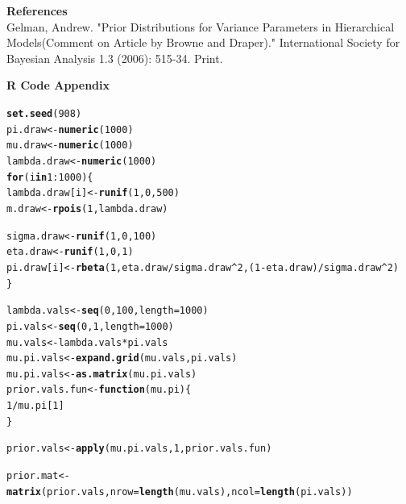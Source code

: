 \documentclass[12pt]{article}\usepackage[]{graphicx}\usepackage[]{color}
\makeatletter
\newcommand{\hlnum}[1]{\textcolor[rgb]{0.686,0.059,0.569}{#1}}%
\newcommand{\hlopt}[1]{\textcolor[rgb]{0,0,0}{#1}}%
\newcommand{\hlstd}[1]{\textcolor[rgb]{0.345,0.345,0.345}{#1}}%
\newcommand{\hlkwa}[1]{\textcolor[rgb]{0.161,0.373,0.58}{\textbf{#1}}}%
\newcommand{\hlkwb}[1]{\textcolor[rgb]{0.69,0.353,0.396}{#1}}%
\newcommand{\hlkwc}[1]{\textcolor[rgb]{0.333,0.667,0.333}{#1}}%
\newcommand{\hlkwd}[1]{\textcolor[rgb]{0.737,0.353,0.396}{\textbf{#1}}}%
\newenvironment{kframe}{%
 \def\at@end@of@kframe{}%
 \ifinner\ifhmode%
  \def\at@end@of@kframe{\end{minipage}}%
  \begin{minipage}{\columnwidth}%
 \fi\fi%
 \def\FrameCommand##1{\hskip\@totalleftmargin \hskip-\fboxsep
 \colorbox{shadecolor}{##1}\hskip-\fboxsep
     \hskip-\linewidth \hskip-\@totalleftmargin \hskip\columnwidth}%
 \MakeFramed {\advance\hsize-\width
   \@totalleftmargin\z@ \linewidth\hsize
   \@setminipage}}%
 {\par\unskip\endMakeFramed%
 \at@end@of@kframe}
\newenvironment{knitrout}{}{} %
\makeatother
\begin{document}
{\Large \bf References} \\

\noindent Gelman, Andrew. "Prior Distributions for Variance Parameters in Hierarchical Models(Comment on Article by Browne and Draper)." International Society for Bayesian Analysis 1.3 (2006): 515-34. Print.

{\Large \bf R Code Appendix}

\begin{knitrout}\footnotesize
{}\color{fgcolor}\begin{kframe}
\begin{alltt}
\hlkwd{set.seed}\hlstd{(}\hlnum{908}\hlstd{)}
\hlstd{pi.draw} \hlkwb{<-} \hlkwd{numeric}\hlstd{(}\hlnum{1000}\hlstd{)}
\hlstd{mu.draw} \hlkwb{<-} \hlkwd{numeric}\hlstd{(}\hlnum{1000}\hlstd{)}
\hlstd{lambda.draw} \hlkwb{<-} \hlkwd{numeric}\hlstd{(}\hlnum{1000}\hlstd{)}
\hlkwa{for}\hlstd{(i} \hlkwa{in} \hlnum{1}\hlopt{:}\hlnum{1000}\hlstd{)\{}
  \hlstd{lambda.draw[i]} \hlkwb{<-} \hlkwd{runif}\hlstd{(}\hlnum{1}\hlstd{,} \hlnum{0}\hlstd{,} \hlnum{500}\hlstd{)}
  \hlstd{m.draw} \hlkwb{<-} \hlkwd{rpois}\hlstd{(}\hlnum{1}\hlstd{, lambda.draw)}

  \hlstd{sigma.draw} \hlkwb{<-} \hlkwd{runif}\hlstd{(}\hlnum{1}\hlstd{,} \hlnum{0}\hlstd{,} \hlnum{100}\hlstd{)}
  \hlstd{eta.draw} \hlkwb{<-} \hlkwd{runif}\hlstd{(}\hlnum{1}\hlstd{,} \hlnum{0}\hlstd{,} \hlnum{1}\hlstd{)}
  \hlstd{pi.draw[i]} \hlkwb{<-} \hlkwd{rbeta}\hlstd{(}\hlnum{1}\hlstd{, eta.draw}\hlopt{/}\hlstd{sigma.draw}\hlopt{^}\hlnum{2}\hlstd{, (}\hlnum{1}\hlopt{-}\hlstd{eta.draw)}\hlopt{/}\hlstd{sigma.draw}\hlopt{^}\hlnum{2}\hlstd{)}
\hlstd{\}}

\hlstd{lambda.vals} \hlkwb{<-} \hlkwd{seq}\hlstd{(}\hlnum{0}\hlstd{,} \hlnum{100}\hlstd{,} \hlkwc{length}\hlstd{=}\hlnum{1000}\hlstd{)}
\hlstd{pi.vals} \hlkwb{<-} \hlkwd{seq}\hlstd{(}\hlnum{0}\hlstd{,} \hlnum{1}\hlstd{,} \hlkwc{length}\hlstd{=}\hlnum{1000}\hlstd{)}
\hlstd{mu.vals} \hlkwb{<-} \hlstd{lambda.vals}\hlopt{*}\hlstd{pi.vals}
\hlstd{mu.pi.vals} \hlkwb{<-} \hlkwd{expand.grid}\hlstd{(mu.vals, pi.vals)}
\hlstd{mu.pi.vals} \hlkwb{<-} \hlkwd{as.matrix}\hlstd{(mu.pi.vals)}
\hlstd{prior.vals.fun} \hlkwb{<-} \hlkwa{function}\hlstd{(}\hlkwc{mu.pi}\hlstd{)\{}
  \hlnum{1}\hlopt{/}\hlstd{mu.pi[}\hlnum{1}\hlstd{]}
\hlstd{\}}

\hlstd{prior.vals} \hlkwb{<-} \hlkwd{apply}\hlstd{(mu.pi.vals,} \hlnum{1}\hlstd{, prior.vals.fun)}

\hlstd{prior.mat} \hlkwb{<-} \hlkwd{matrix}\hlstd{(prior.vals,} \hlkwc{nrow}\hlstd{=}\hlkwd{length}\hlstd{(mu.vals),} \hlkwc{ncol}\hlstd{=}\hlkwd{length}\hlstd{(pi.vals))}


\end{alltt}
\end{kframe}
\end{knitrout}
\end{document}
